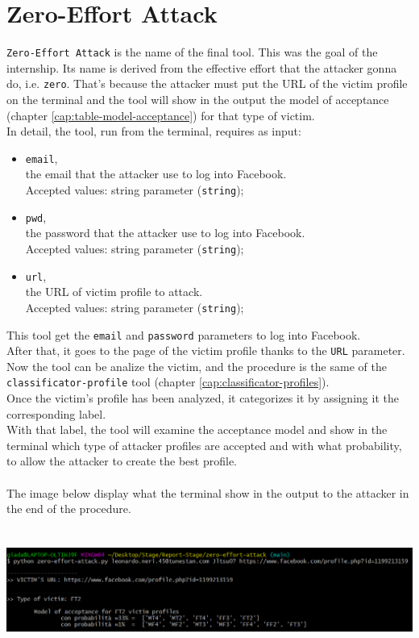 \section{Zero-Effort Attack}
\label{cap:zero-effort-attack}
\texttt{Zero-Effort Attack} is the name of the final tool. This was the goal of the internship. Its name is derived from the effective effort that the attacker gonna do, i.e. \texttt{zero}. That's because the attacker must put the URL of the victim profile on the terminal and the tool will show in the output the model of acceptance (chapter \ref{cap:table-model-acceptance}) for that type of victim.\\In detail, the tool, run from the terminal, requires as input:
\begin{itemize}
	\item \texttt{email},\\the email that the attacker use to log into Facebook.\\Accepted values: string parameter (\texttt{string});
	
	\item \texttt{pwd},\\the password that the attacker use to log into Facebook.\\Accepted values: string parameter (\texttt{string});
	
	\item \texttt{url},\\the URL of victim profile to attack.\\Accepted values: string parameter (\texttt{string});
\end{itemize}
This tool get the \texttt{email} and \texttt{password} parameters to log into Facebook.\\After that, it goes to the page of the victim profile thanks to the \texttt{URL} parameter.
Now the tool can be analize the victim, and the procedure is the same of the \texttt{classificator-profile} tool (chapter \ref{cap:classificator-profiles}).
\\Once the victim's profile has been analyzed, it categorizes it by assigning it the corresponding label.\\
With that label, the tool will examine the acceptance model and show in the terminal which type of attacker profiles are accepted and with what probability, to allow the attacker to create the best profile.
\\\\The image below display what the terminal show in the output to the attacker in the end of the procedure.\\\\
\begin{center}
	\includegraphics[height=3cm]{immagini/zero-effort-exe.png}
\end{center}